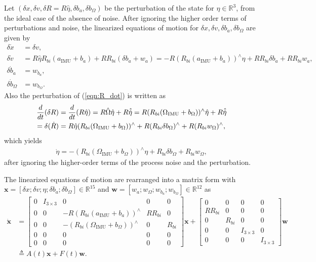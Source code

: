 \documentclass[11pt]{article}
\renewcommand{\Re}{\ensuremath{\mathbb{R}}}
\newcommand{\refeqn}[1]{(\ref{eqn:#1})}
\newcommand{\x}{\mathbf{x}}
\newcommand{\w}{\mathbf{w}}
\begin{document}
Let $(\delta x ,\delta v, \delta R = R\hat\eta,\delta b_a,\delta b_\Omega)$ be the perturbation of the state for $\eta\in\Re^3$, from the ideal case of the absence of noise.  After ignoring the higher order terms of perturbations and noise, the linearized equations of motion for $\delta x, \delta v, \delta b_a, \delta b_\Omega$ are given by
\begin{align*}
\delta \dot x & = \delta v,\\
\delta \dot v & = R \hat \eta R_{bi} (a_{\mathrm{IMU}}+b_a)+ R R_{bi} (\delta b_a +w_a)
= -R(R_{bi} (a_{\mathrm{IMU}}+b_a))^\wedge \eta + R R_{bi} \delta b_a + R R_{bi} w_a,\\
\delta \dot b_a & = w_{b_a},\\
\delta \dot b_\Omega & = w_{b_\Omega}.
\end{align*}
Also the perturbation of \refeqn{R_dot} is written as
\begin{align*}
\frac{d}{dt}(\delta R) & =\frac{d}{dt}(R\hat\eta)= R\hat\Omega\hat\eta + R\hat{\dot\eta}
= R(R_{bi}(\Omega_{\mathrm{IMU}} + b_\Omega))^\wedge\hat\eta + R\hat{\dot\eta}\\
= \delta (\dot R) & = R\hat\eta(R_{bi}(\Omega_{\mathrm{IMU}}+b_\Omega))^\wedge + R(R_{bi}\delta b_\Omega)^\wedge+ R(R_{bi}w_\Omega)^\wedge,
\end{align*}
which yields
\begin{align*}
\dot\eta = -(R_{bi}(\Omega_{\mathrm{IMU}}+b_\Omega))^\wedge\eta+R_{bi}\delta b_\Omega + R_{bi}w_\Omega, 
\end{align*}
after ignoring the higher-order terms of the process noise and the perturbation. 

The linearized equations of motion are rearranged into a matrix form with $\x=[\delta x; \delta v; \eta; \delta b_a;\delta b_\Omega]\in\Re^{15}$ and $\w=[w_a; w_\Omega; w_{b_a}; w_{b_\Omega}]\in\Re^{12}$  as
\begin{align}
\dot{\x} &= 
\begin{bmatrix} 0 & I_{3\times 3} & 0 & 0 & 0 \\
0 & 0 & -R(R_{bi}(a_{\mathrm{IMU}}+b_a))^\wedge & R R_{bi} & 0\\
0 & 0 & -(R_{bi}(\Omega_{\mathrm{IMU}}+b_\Omega))^\wedge & 0 & R_{bi} \\
0 & 0 & 0 & 0 & 0\\
0 & 0 & 0 & 0 & 0
\end{bmatrix}
\x 
+
\begin{bmatrix}
0 & 0  & 0 & 0 \\
R R_{bi} & 0 & 0 & 0 \\
0 & R_{bi} & 0 & 0 \\
0 & 0 & I_{3\times 3} & 0 \\
0 & 0 & 0 & I_{3\times 3}
\end{bmatrix}
\w\nonumber\\
&\triangleq  A(t)\x + F(t)\w.
\end{align}
\end{document}
